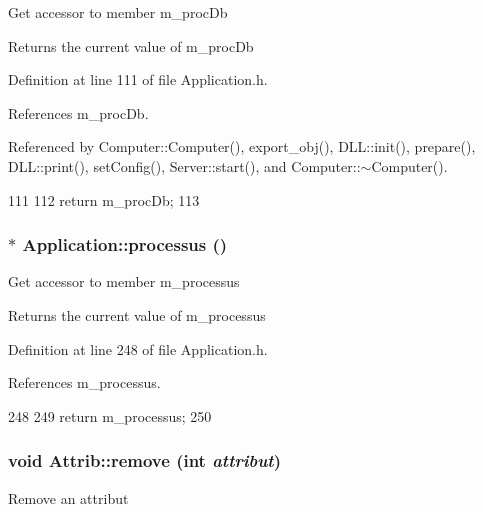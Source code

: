 \label{classApplication_aa5c28af1a7e1c41dada2db2a4d03c57d}
Get accessor to member m\_\-procDb \begin{DoxyReturn}{Returns}
the current value of m\_\-procDb 
\end{DoxyReturn}


Definition at line 111 of file Application.h.

References m\_\-procDb.

Referenced by Computer::Computer(), export\_\-obj(), DLL::init(), prepare(), DLL::print(), setConfig(), Server::start(), and Computer::$\sim$Computer().


\begin{DoxyCode}
111                           {
112     return m_procDb;
113   }
\end{DoxyCode}
\hypertarget{classApplication_a8d0918e800a5de01795bc2669d74ed82}{
\subsubsection[{processus}]{$\ast$ Application::processus ()}}
\label{classApplication_a8d0918e800a5de01795bc2669d74ed82}
Get accessor to member m\_\-processus \begin{DoxyReturn}{Returns}
the current value of m\_\-processus 
\end{DoxyReturn}


Definition at line 248 of file Application.h.

References m\_\-processus.


\begin{DoxyCode}
248                           {
249     return m_processus;
250   }
\end{DoxyCode}
\hypertarget{classAttrib_a7d4ef7e32d93cb287792b87b857e79f3}{
\subsubsection[{remove}]{\setlength{\rightskip}{0pt plus 5cm}void Attrib::remove (int {\em attribut})}}
\label{classAttrib_a7d4ef7e32d93cb287792b87b857e79f3}
Remove an attribut 


